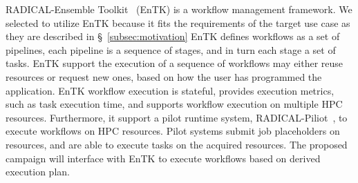 RADICAL-Ensemble Toolkit~\cite{balasubramanian2018harnessing} (EnTK) is a workflow management framework.
We selected to utilize EnTK because it fits the requirements of the target use case as they are described in \S~\ref{subsec:motivation}
EnTK defines workflows as a set of pipelines, each pipeline is a sequence of stages, and in turn each stage a set of tasks.
EnTK support the execution of a sequence of workflows may either reuse resources or request new ones, based on how the user has programmed the application.
EnTK workflow execution is stateful, provides execution metrics, such as task execution time, and supports workflow execution on multiple HPC resources.
Furthermore, it support a pilot runtime system, RADICAL-Piliot~\cite{merzky2019using}, to execute workflows on HPC resources.
Pilot systems submit job placeholders on resources, and are able to execute tasks on the acquired resources.
The proposed campaign will interface with EnTK to execute workflows based on derived execution plan.


